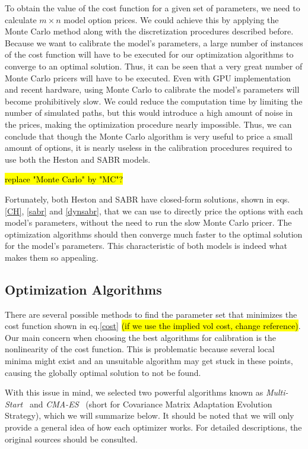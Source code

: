 To obtain the value of the cost function for a given set of parameters, we need to calculate $m\times n$ model option prices. We could achieve this by applying the Monte Carlo method along with the discretization procedures described before.
Because we want to calibrate the model's parameters, a large number of instances of the cost function will have to be executed for our optimization algorithms to converge to an optimal solution.
Thus, it can be seen that a very great number of Monte Carlo pricers will have to be executed. Even with GPU implementation and recent hardware, using Monte Carlo to calibrate the model's parameters will become prohibitively slow. We could reduce the computation time by limiting the number of simulated paths, but this would introduce a high amount of noise in the prices, making the optimization procedure nearly impossible.
Thus, we can conclude that though the Monte Carlo algorithm is very useful to price a small amount of options, it is nearly useless in the calibration procedures required to use both the Heston and SABR models.

\hl{replace "Monte Carlo" by "MC"?}

Fortunately, both Heston and SABR have closed-form solutions, shown in eqs. \eqref{CH}, \eqref{sabr} and \eqref{dynsabr}, that we can use to directly price the options with each model's parameters, without the need to run the slow Monte Carlo pricer. The optimization algorithms should then converge much faster to the optimal solution for the model's parameters. This characteristic of both models is indeed what makes them so appealing. 






\subsection{Optimization Algorithms}
There are several possible methods to find the parameter set that minimizes the cost function shown in eq.\eqref{cost} \hl{(if we use the implied vol cost, change reference)}.
Our main concern when choosing the best algorithms for calibration is the nonlinearity of the cost function. This is problematic because several local minima might exist and an unsuitable algorithm may get stuck in these points, causing the globally optimal solution to not be found.

With this issue in mind, we selected two powerful algorithms known as \emph{Multi-Start}~\cite{Ugray} and \emph{CMA-ES}~\cite{Hansen2} (short for Covariance Matrix Adaptation Evolution Strategy), which we will summarize below. It should be noted that we will only provide a general idea of how each optimizer works. For detailed descriptions, the original sources should be consulted.

